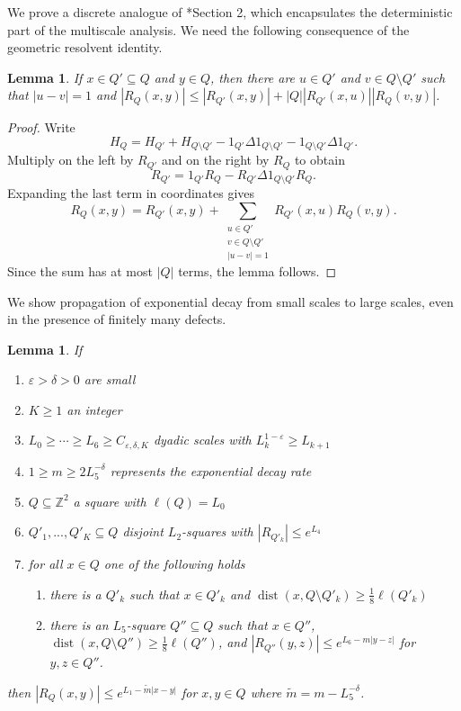 \documentclass{amsart}
\newtheorem{lemma}[equation]{Lemma}
\numberwithin{equation}{section}
\numberwithin{figure}{section}
\newcommand{\Z}{\mathbb{Z}}
\newcommand{\ep}{\varepsilon}
\newcommand{\id}{1}
\newcommand{\dist}{\operatorname{dist}}
\begin{document}
We prove a discrete analogue of \cite{Bourgain-Kenig}*{Section 2}, which encapsulates the deterministic part of the multiscale analysis.  We need the following consequence of the geometric resolvent identity.

\begin{lemma}
If $x \in Q' \subseteq Q$ and $y \in Q$, then there are $u \in Q'$ and $v \in Q \setminus Q'$ such that $|u - v| = 1$ and $|R_Q(x,y)| \leq |R_{Q'}(x,y)| + |Q| |R_{Q'}(x,u)| |R_Q(v,y)|$.
\end{lemma}

\begin{proof}
Write
\begin{equation*}
H_Q = H_{Q'} + H_{Q \setminus Q'} - \id_{Q'} \Delta \id_{Q \setminus Q'} - \id_{Q \setminus Q'} \Delta \id_{Q'}.
\end{equation*}
Multiply on the left by $R_{Q'}$ and on the right by $R_{Q}$ to obtain
\begin{equation*}
R_{Q'} = \id_{Q'} R_Q - R_{Q'} \Delta \id_{Q \setminus Q'} R_{Q}.
\end{equation*}
Expanding the last term in coordinates gives
\begin{equation*}
R_Q(x,y) = R_{Q'}(x,y) + \sum_{\substack{u \in Q' \\ v \in Q \setminus Q' \\ |u - v| = 1}} R_{Q'}(x,u) R_Q(v,y).
\end{equation*}
Since the sum has at most $|Q|$ terms, the lemma follows.
\end{proof}

We show propagation of exponential decay from small scales to large scales, even in the presence of finitely many defects.

\begin{lemma}
\label{l.multiscale}
If
\begin{enumerate}
\item $\ep > \delta > 0$ are small
\item $K \geq 1$ an integer
\item $L_0 \geq \cdots \geq L_6 \geq C_{\ep,\delta,K}$ dyadic scales with $L_k^{1-\ep} \geq L_{k+1}$
\item $1 \geq m \geq 2 L_5^{-\delta}$ represents the exponential decay rate
\item $Q \subseteq \Z^2$ a square with $\ell(Q) = L_0$
\item $Q'_1, ..., Q'_K \subseteq Q$ disjoint $L_2$-squares with $|R_{Q'_k}| \leq e^{L_4}$
\item for all $x \in Q$ one of the following holds
\begin{enumerate}
\item there is a $Q'_k$ such that $x \in Q'_k$ and $\dist(x,Q \setminus Q'_k) \geq \tfrac18 \ell(Q'_k)$
\item there is an $L_5$-square $Q'' \subseteq Q$ such that $x \in Q''$, $\dist(x,Q \setminus Q'') \geq \tfrac18 \ell(Q'')$, and $|R_{Q''}(y,z)| \leq e^{L_6 - m |y-z|}$ for $y, z \in Q''$.
\end{enumerate}
\end{enumerate}
then $|R_Q(x,y)| \leq e^{L_1 - \tilde m |x-y|}$ for $x, y \in Q$ where $\tilde m = m - L_5^{-\delta}$.
\end{lemma}
\end{document}
